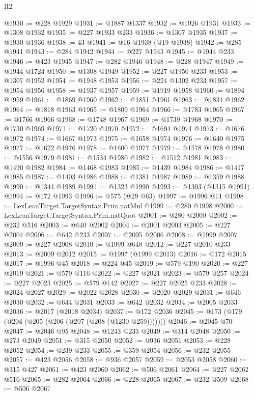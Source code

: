 \begin{lexlean}{R2}
\begin{coremodule}
@1930 := @228 @1929
@1931 := @1887 @1337
@1932 := @1926 @1931
@1933 := @1308 @1932
@1935 := @227 @1933 @233
@1936 := @1307 @1935
@1937 := @1930 @1936
@1938 := 43
@1941 := @16 @1938 (@19 @1938)
@1942 := @285 @1941
@1943 := @284 @1942
@1944 := @227 @1943
@1945 := @1944 @233
@1946 := @423 @1945
@1947 := @282 @1946
@1948 := @228 @1947
@1949 := @1944 @1724
@1950 := @1308 @1949
@1952 := @227 @1950 @233
@1953 := @1307 @1952
@1954 := @1948 @1953
@1956 := @224 @1302 @233
@1957 := @1954 @1956
@1958 := @1937 @1957
@1959 := @1919 @1958
@1960 := @1894 @1959
@1961 := @1869 @1960
@1962 := @1851 @1961
@1963 := @1834 @1962
@1964 := @1818 @1963
@1965 := @1809 @1964
@1966 := @1783 @1965
@1967 := @1766 @1966
@1968 := @1748 @1967
@1969 := @1739 @1968
@1970 := @1730 @1969
@1971 := @1720 @1970
@1972 := @1694 @1971
@1973 := @1676 @1972
@1974 := @1667 @1973
@1975 := @1658 @1974
@1976 := @1640 @1975
@1977 := @1622 @1976
@1978 := @1600 @1977
@1979 := @1578 @1978
@1980 := @1556 @1979
@1981 := @1534 @1980
@1982 := @1512 @1981
@1983 := @1490 @1982
@1984 := @1468 @1983
@1985 := @1439 @1984
@1986 := @1417 @1985
@1987 := @1403 @1986
@1988 := @1381 @1987
@1989 := @1359 @1988
@1990 := @1344 @1989
@1991 := @1323 @1990
@1993 := @1303 (@1315 @1991)
@1994 := @172 @1993
@1996 := @575 (@29 @63)
@1997 := @1996 @11
@1998 := LexLeanTarget.TargetSyntax.Prim.natMul
@1999 := @280 @1998
@2000 := LexLeanTarget.TargetSyntax.Prim.natQuot
@2001 := @280 @2000
@2002 := @232 @516
@2003 := @640 @2002
@2004 := @2001 @2003
@2005 := @227 @2004
@2006 := @642 @233
@2007 := @2005 @2006
@2008 := @1999 @2007
@2009 := @227 @2008
@2010 := @1999 @648
@2012 := @227 @2010 @233
@2013 := @2009 @2012
@2015 := @1997 (@1999 @2013)
@2016 := @172 @2015
@2017 := @1996 @45
@2018 := @224 @45
@2019 := @579 @190
@2020 := @227 @2019
@2021 := @579 @116
@2022 := @227 @2021
@2023 := @579 @257
@2024 := @227 @2023
@2025 := @579 @142
@2027 := @227 @2025 @233
@2028 := @2024 @2027
@2029 := @2022 @2028
@2030 := @2020 @2029
@2031 := @646 @2030
@2032 := @644 @2031
@2033 := @642 @2032
@2034 := @2005 @2033
@2036 := @2017 (@2018 @2034)
@2037 := @172 @2036
@2045 := @173 (@179 (@204 (@205 (@206 (@207 (@208 (@1230 @259)))))))
@2046 := @2045 @70
@2047 := @2046 @95
@2048 := @1243 @233
@2049 := @314 @2048
@2050 := @273 @2049
@2051 := @315 @2050
@2052 := @936 @2051
@2053 := @228 @2052
@2054 := @239 @233
@2055 := @359 @2054
@2056 := @232 @2055
@2057 := @423 @2056
@2058 := @936 @2057
@2059 := @2053 @2058
@2060 := @315 @427
@2061 := @423 @2060
@2062 := @506 @2061
@2064 := @227 @2062 @516
@2065 := @282 @2064
@2066 := @228 @2065
@2067 := @232 @509
@2068 := @506 @2067

\end{coremodule}
\end{lexlean}
